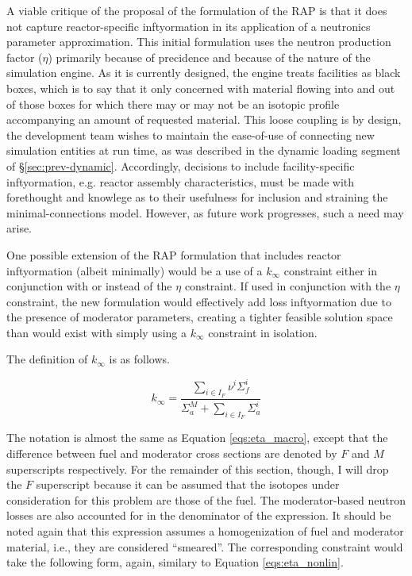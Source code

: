 A viable critique of the proposal of the formulation of the RAP is that it does
not capture reactor-specific inftyormation in its application of a neutronics
parameter approximation. This initial formulation uses the neutron production
factor ($\eta$) primarily because of precidence and because of the nature of the
\Cyclus simulation engine. As it is currently designed, the \Cyclus engine
treats facilities as black boxes, which is to say that it only concerned with
material flowing into and out of those boxes for which there may or may not be
an isotopic profile accompanying an amount of requested material. This loose
coupling is by design, the \Cyclus development team wishes to maintain the
ease-of-use of connecting new simulation entities at run time, as was described
in the dynamic loading segment of \S\ref{sec:prev-dynamic}. Accordingly,
decisions to include facility-specific inftyormation, e.g. reactor assembly
characteristics, must be made with forethought and knowlege as to their
usefulness for inclusion and straining the minimal-connections model. However,
as future work progresses, such a need may arise.

One possible extension of the RAP formulation that includes reactor inftyormation
(albeit minimally) would be a use of a $k_{\infty}$ constraint either in
conjunction with or instead of the $\eta$ constraint. If used in conjunction
with the $\eta$ constraint, the new formulation would effectively add loss
inftyormation due to the presence of moderator parameters, creating a tighter
feasible solution space than would exist with simply using a $k_{\infty}$
constraint in isolation. 

The definition of $k_{\infty}$ is as follows.

\begin{equation}\label{eqs:kinf_macro}
k_{\infty} = \frac{\sum_{i \in I_{F}} \nu^{i} \Sigma_{f}^{i}}
                  {\Sigma_{a}^{M} + \sum_{i \in I_{F}} \Sigma_{a}^{i}}
\end{equation}

The notation is almost the same as Equation \ref{eqs:eta_macro}, except that the
difference between fuel and moderator cross sections are denoted by $F$ and $M$
superscripts respectively. For the remainder of this section, though, I will
drop the $F$ superscript because it can be assumed that the isotopes under
consideration for this problem are those of the fuel. The moderator-based
neutron losses are also accounted for in the denominator of the expression. It
should be noted again that this expression assumes a homogenization of fuel and
moderator material, i.e., they are considered ``smeared''. The corresponding
constraint would take the following form, again, similary to Equation
\ref{eqs:eta_nonlin}.

